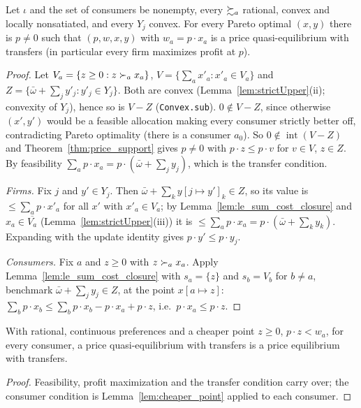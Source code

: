 \begin{theorem}
\label{thm:second_welfare_production}
\leanok
{}
Let $\iota$ and the set of consumers be nonempty, every $\succsim_a$ rational, convex and locally nonsatiated, and every
$Y_j$ convex. For every Pareto optimal $(x, y)$ there is $p \neq 0$ such that $(p, w, x, y)$ with $w_a = p \cdot x_a$ is
a price quasi-equilibrium with transfers (in particular every firm maximizes profit at $p$).
\end{theorem}
\begin{proof}
\leanok
{}
Let $V_a = \{z \ge 0 : z \succ_a x_a\}$, $V = \{\sum_a x'_a : x'_a \in V_a\}$ and
$Z = \{\bar\omega + \sum_j y'_j : y'_j \in Y_j\}$. Both are convex (Lemma~\ref{lem:strictUpper}(ii); convexity of $Y_j$),
hence so is $V - Z$ (\texttt{Convex.sub}). $0 \notin V - Z$, since otherwise $(x', y')$ would be a feasible allocation
making every consumer strictly better off, contradicting Pareto optimality (there is a consumer $a_0$). So
$0 \notin \operatorname{int}(V - Z)$ and Theorem~\ref{thm:price_support} gives $p \neq 0$ with
$p \cdot z \le p \cdot v$ for $v \in V$, $z \in Z$. By feasibility $\sum_a p \cdot x_a = p \cdot(\bar\omega + \sum_j y_j)$,
which is the transfer condition.

\emph{Firms.} Fix $j$ and $y' \in Y_j$. Then $\bar\omega + \sum_k y[j\mapsto y']_k \in Z$, so its value is
$\le \sum_a p \cdot x'_a$ for all $x'$ with $x'_a \in V_a$; by Lemma~\ref{lem:le_sum_cost_closure} and
$x_a \in \overline{V_a}$ (Lemma~\ref{lem:strictUpper}(iii)) it is $\le \sum_a p \cdot x_a = p\cdot(\bar\omega + \sum_k y_k)$.
Expanding with the update identity gives $p \cdot y' \le p \cdot y_j$.

\emph{Consumers.} Fix $a$ and $z \ge 0$ with $z \succ_a x_a$. Apply Lemma~\ref{lem:le_sum_cost_closure} with
$s_a = \{z\}$ and $s_b = V_b$ for $b \ne a$, benchmark $\bar\omega + \sum_j y_j \in Z$, at the point $x[a \mapsto z]$:
$\sum_b p\cdot x_b \le \sum_b p \cdot x_b - p\cdot x_a + p \cdot z$, i.e.\ $p\cdot x_a \le p \cdot z$.
\end{proof}

\begin{theorem}
\label{thm:quasi_to_eq_production}
\leanok
{}
With rational, continuous preferences and a cheaper point $z \ge 0$, $p \cdot z < w_a$, for every consumer, a price
quasi-equilibrium with transfers is a price equilibrium with transfers.
\end{theorem}
\begin{proof}
\leanok
{}
Feasibility, profit maximization and the transfer condition carry over; the consumer condition is
Lemma~\ref{lem:cheaper_point} applied to each consumer.
\end{proof}

